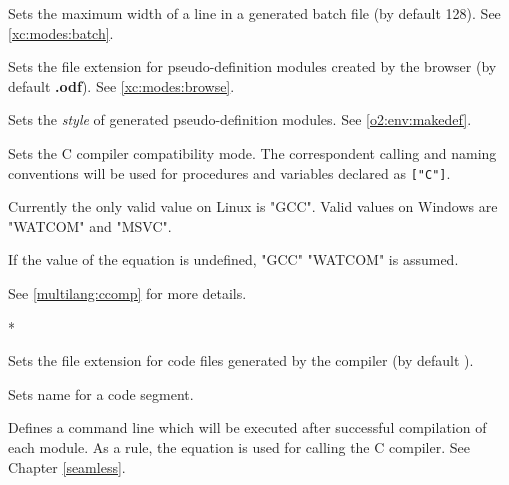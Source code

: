 \begin{description}
        Sets the maximum width of a line in a
        generated batch file (by default 128).
        See \ref{xc:modes:batch}.

        \MLBegin{}\ModeB{}\MLEnd{}

        Sets the file extension for pseudo-definition
        modules created by the browser (by default {\bf .odf}).
        See \ref{xc:modes:browse}.

        \MLBegin{}\ModeB{}\MLEnd{}

        Sets the {\em style} of generated pseudo-definition
        modules. See \ref{o2:env:makedef}.

\ifgencode
{}
        \MLBegin{}\ModeC{}\MLEnd{}

        Sets the C compiler compatibility mode.
        The correspondent calling and naming conventions  will be used 
        for procedures and variables declared as \verb'["C"]'.

        \iflinux
          Currently the only valid value on Linux is "GCC".
        \else
          \ifwinnt
            Valid values on Windows are "WATCOM" and "MSVC".
          \else
            \JNO
          \fi
        \fi

        If the value of the equation is undefined,
        \iflinux "GCC" \else "WATCOM" \fi
        is assumed.

        See \ref{multilang:ccomp} for more details.

\fi

\ifgenc
{}
\else %
\fi
        \MLBegin{}*\MLEnd{}

        Sets the file extension for code
        files generated by the compiler
        (by default {\bf \Code}).

\ifgencode
{}
        \MLBegin{}\ModeC{}\MLEnd{} \header

        Sets name for a code segment.
\fi

\ifcomment
{}
        \MLBegin{}\ModeC{}\MLEnd{}

        Defines a command line which will be executed
        after successful compilation of each module.
        As a rule, the equation is used for calling
        the C compiler. See Chapter \ref{seamless}.
\fi


\end{description}
